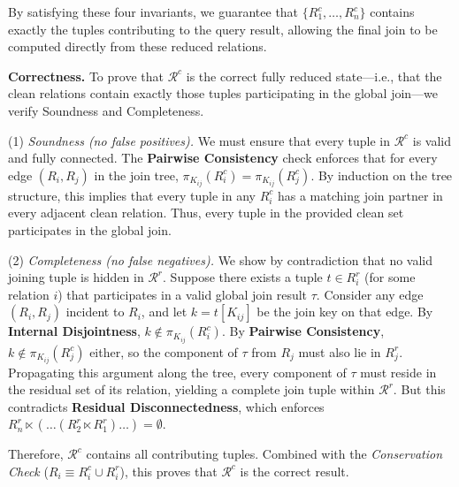 \documentclass[sigconf]{acmart}
\renewcommand{\emph}[1]{\textit{#1}}
\begin{document}
By satisfying these four invariants, we guarantee that $\{R_1^c, \dots, R_n^c\}$ contains exactly the tuples contributing to the query result, allowing the final join to be computed directly from these reduced relations.




\textbf{Correctness.}
To prove that $\mathcal{R}^c$ is the correct fully reduced state---i.e., that the clean relations contain exactly those tuples participating in the global join---we verify Soundness and Completeness.

\noindent (1) \emph{Soundness (no false positives).}
We must ensure that every tuple in $\mathcal{R}^c$ is valid and fully connected.
The \textbf{Pairwise Consistency} check enforces that for every edge $(R_i, R_j)$ in the join tree, $\pi_{K_{ij}}(R_i^c) = \pi_{K_{ij}}(R_j^c)$. By induction on the tree structure, this implies that every tuple in any $R_i^c$ has a matching join partner in every adjacent clean relation. Thus, every tuple in the provided clean set participates in the global join.

\noindent (2) \emph{Completeness (no false negatives).}
We show by contradiction that no valid joining tuple is hidden in $\mathcal{R}^r$.
Suppose there exists a tuple $t \in R_i^r$ (for some relation $i$) that participates in a valid global join result $\tau$. Consider any edge $(R_i, R_j)$ incident to $R_i$, and let $k = t[K_{ij}]$ be the join key on that edge. By \textbf{Internal Disjointness}, $k \notin \pi_{K_{ij}}(R_i^c)$. By \textbf{Pairwise Consistency}, $k \notin \pi_{K_{ij}}(R_j^c)$ either, so the component of $\tau$ from $R_j$ must also lie in $R_j^r$. Propagating this argument along the tree, every component of $\tau$ must reside in the residual set of its relation, yielding a complete join tuple within $\mathcal{R}^r$. But this contradicts \textbf{Residual Disconnectedness}, which enforces $R_n^r \ltimes (\dots (R_2^r \ltimes R_1^r)\dots) = \emptyset$.

Therefore, $\mathcal{R}^c$ contains all contributing tuples. Combined with the \emph{Conservation Check} ($R_i \equiv R_i^c \cup R_i^r$), this proves that $\mathcal{R}^c$ is the correct result.
\end{document}

